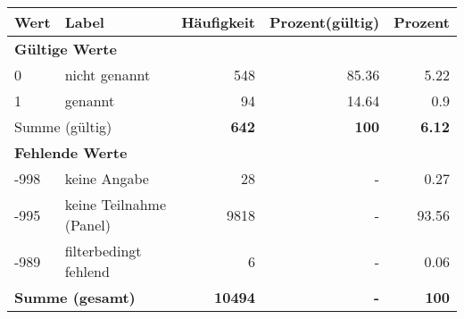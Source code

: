      \begin{longtable}{lXrrr}
     \toprule
     \textbf{Wert} & \textbf{Label} & \textbf{Häufigkeit} & \textbf{Prozent(gültig)} & \textbf{Prozent} \\
     \endhead
     \midrule
     \multicolumn{5}{l}{\textbf{Gültige Werte}}\\

     0 &
     \multicolumn{1}{X}{ nicht genannt   } &


       \num{548} &
       \num[round-mode=places,round-precision=2]{85,36} &
         \num[round-mode=places,round-precision=2]{5,22} \\

     1 &
     \multicolumn{1}{X}{ genannt   } &


       \num{94} &
       \num[round-mode=places,round-precision=2]{14,64} &
         \num[round-mode=places,round-precision=2]{0,9} \\
     \midrule
     \multicolumn{2}{l}{Summe (gültig)} &
       \textbf{\num{642}} &
     \textbf{100} &
       \textbf{\num[round-mode=places,round-precision=2]{6,12}} \\
     \multicolumn{5}{l}{\textbf{Fehlende Werte}}\\
       -998 &
       keine Angabe &
         \num{28} &
        - &
         \num[round-mode=places,round-precision=2]{0,27} \\
       -995 &
       keine Teilnahme (Panel) &
         \num{9818} &
        - &
         \num[round-mode=places,round-precision=2]{93,56} \\
       -989 &
       filterbedingt fehlend &
         \num{6} &
        - &
         \num[round-mode=places,round-precision=2]{0,06} \\
     \midrule
     \multicolumn{2}{l}{\textbf{Summe (gesamt)}} &
          \textbf{\num{10494}} &
        \textbf{-} &
        \textbf{100} \\
     \bottomrule
     \end{longtable}
     
